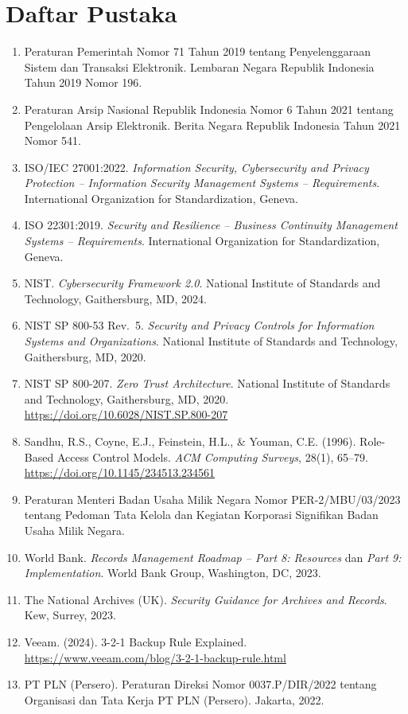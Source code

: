 \documentclass[12pt,a4paper]{report}
\begin{document}
\section*{Daftar Pustaka}
\begin{enumerate}[leftmargin=*, nosep]
    \item Peraturan Pemerintah Nomor 71 Tahun 2019 tentang Penyelenggaraan Sistem dan Transaksi Elektronik. Lembaran Negara Republik Indonesia Tahun 2019 Nomor 196.
    \item Peraturan Arsip Nasional Republik Indonesia Nomor 6 Tahun 2021 tentang Pengelolaan Arsip Elektronik. Berita Negara Republik Indonesia Tahun 2021 Nomor 541.
    \item ISO/IEC 27001:2022. \textit{Information Security, Cybersecurity and Privacy Protection -- Information Security Management Systems -- Requirements}. International Organization for Standardization, Geneva.
    \item ISO 22301:2019. \textit{Security and Resilience -- Business Continuity Management Systems -- Requirements}. International Organization for Standardization, Geneva.
    \item NIST. \textit{Cybersecurity Framework 2.0}. National Institute of Standards and Technology, Gaithersburg, MD, 2024.
    \item NIST SP 800-53 Rev.~5. \textit{Security and Privacy Controls for Information Systems and Organizations}. National Institute of Standards and Technology, Gaithersburg, MD, 2020.
    \item NIST SP 800-207. \textit{Zero Trust Architecture}. National Institute of Standards and Technology, Gaithersburg, MD, 2020. \url{https://doi.org/10.6028/NIST.SP.800-207}
    \item Sandhu, R.S., Coyne, E.J., Feinstein, H.L., \& Youman, C.E. (1996). Role-Based Access Control Models. \textit{ACM Computing Surveys}, 28(1), 65--79. \url{https://doi.org/10.1145/234513.234561}
    \item Peraturan Menteri Badan Usaha Milik Negara Nomor PER-2/MBU/03/2023 tentang Pedoman Tata Kelola dan Kegiatan Korporasi Signifikan Badan Usaha Milik Negara.
    \item World Bank. \textit{Records Management Roadmap -- Part 8: Resources} dan \textit{Part 9: Implementation}. World Bank Group, Washington, DC, 2023.
    \item The National Archives (UK). \textit{Security Guidance for Archives and Records}. Kew, Surrey, 2023.
    \item Veeam. (2024). 3-2-1 Backup Rule Explained. \url{https://www.veeam.com/blog/3-2-1-backup-rule.html}
    \item PT PLN (Persero). Peraturan Direksi Nomor 0037.P/DIR/2022 tentang Organisasi dan Tata Kerja PT PLN (Persero). Jakarta, 2022.
\end{enumerate}
\end{document}
